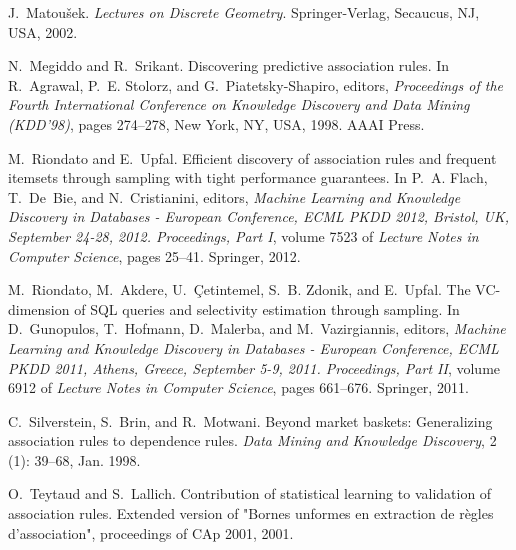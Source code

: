 \begin{thebibliography}{42}
J.~Matou\v{s}ek.
\newblock \emph{Lectures on Discrete Geometry}.
\newblock Springer-Verlag, Secaucus, NJ, USA, 2002.

N.~Megiddo and R.~Srikant.
\newblock Discovering predictive association rules.
\newblock In R.~Agrawal, P.~E. Stolorz, and G.~Piatetsky-Shapiro, editors,
  \emph{Proceedings of the Fourth International Conference on Knowledge
  Discovery and Data Mining (KDD'98)}, pages 274--278, New York, NY, USA, 1998.
  AAAI Press.

M.~Riondato and E.~Upfal.
\newblock Efficient discovery of association rules and frequent itemsets
  through sampling with tight performance guarantees.
\newblock In P.~A. Flach, T.~De~Bie, and N.~Cristianini, editors, \emph{Machine
  Learning and Knowledge Discovery in Databases - European Conference, ECML
  PKDD 2012, Bristol, UK, September 24-28, 2012. Proceedings, Part I}, volume
  7523 of \emph{Lecture Notes in Computer Science}, pages 25--41. Springer,
  2012.

M.~Riondato, M.~Akdere, U.~\c{C}etintemel, S.~B. Zdonik, and E.~Upfal.
\newblock The {VC}-dimension of {SQL} queries and selectivity estimation
  through sampling.
\newblock In D.~Gunopulos, T.~Hofmann, D.~Malerba, and M.~Vazirgiannis,
  editors, \emph{Machine Learning and Knowledge Discovery in Databases -
  European Conference, ECML PKDD 2011, Athens, Greece, September 5-9, 2011.
  Proceedings, Part II}, volume 6912 of \emph{Lecture Notes in Computer
  Science}, pages 661--676. Springer, 2011.

\balance

C.~Silverstein, S.~Brin, and R.~Motwani.
\newblock Beyond market baskets: Generalizing association rules to dependence
  rules.
\newblock \emph{Data Mining and Knowledge Discovery}, 2 (1):
  39--68, Jan. 1998.

O.~Teytaud and S.~Lallich.
\newblock Contribution of statistical learning to validation of association
  rules.
\newblock Extended version of "Bornes unformes en extraction de r\`{e}gles
  d'association", proceedings of CAp 2001, 2001.


\end{thebibliography}

